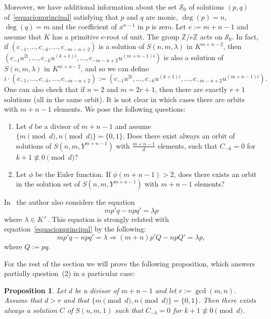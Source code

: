 \documentclass[reqno,a4paper]{amsart}
\newtheorem{proposition}[theorem]{Proposition}
\theoremstyle{definition}
\theoremstyle{remark}
\begin{document}
Moreover, we have additional information about the set $\mathcal{S}_0$ of solutions
$(p,q)$ of~\eqref{equacionprincipal} satisfying that $p$ and $q$ are monic,
$\deg(p) = n$, $\deg(q) = m$ and the coefficient of $x^{n-1}$ in $p$ is zero. Let
$e:=m+n-1$ and assume that $K$ has a primitive $e$-root of unit. The group
$\mathds{Z}/e\mathds{Z}$ acts on $\mathcal{S}_0$. In fact, if
$(c_{-1},\dots,c_{-k},\dots,c_{-m-n+2})$ is a solution of $S(n,m,\lambda)$ in $K^{m+n-2}$,
then $(c_{-1}u^{2i},\dots,c_{-k}u^{(k+1)i},\dots, c_{-m-n+2}u^{(m+n-1)i})$ is also a
solution of $S(n,m,\lambda)$ in $K^{m+n-2}$, and so we can define
$$
i\cdot (c_{-1},\dots,c_{-k},\dots,c_{-m-n+2}) :=
(c_{-1}u^{2i},\dots,c_{-k}u^{(k+1)i},\dots, c_{-m-n+2}u^{(m+n-1)i}).
$$
One can also check that if $n=2$ and $m=2r+1$, then there are exactly $r+1$ solutions
(all in the same orbit). It is not clear in which cases there are orbits with $m+n-1$
elements. We pose the following questions:
\begin{enumerate}

\smallskip

\item Let $d$ be a divisor of $m+n-1$ and assume $\{ m\pmod d,n\pmod d\}=\{0,1\}$. Does there
exist always an orbit of solutions of $S(n,m,Y^{m+n-1})$ with $\frac{m+n-1}{d}$
elements, such that $C_{-k}=0$ for $k+1\not\equiv 0 \pmod d$?

\smallskip

\item Let $\phi$ be the Euler function. If $\phi(m+n-1)>2$, does there exists an
orbit in the solution set of $S(n,m,Y^{m+n-1})$ with $m+n-1$ elements?

\smallskip

\end{enumerate}
%

\smallskip

In~\cite{F} the author also considers the equation
\begin{equation}\label{otra de Formanek}
mp'q-npq'=\lambda p
\end{equation}
where $\lambda\in K^{\times}$. This equation is strongly related with equation~\eqref{equacionprincipal} by
the following:
$$
mp'q-npq'=\lambda\Longrightarrow (m+n)p'Q-npQ'=\lambda p,
$$
where $Q:=pq$.

\smallskip

For the rest of the section we will prove the following proposition, which answers partially question~(2) in a particular case:

\begin{proposition}\label{existencia ralo}
Let $d$ be a divisor of $m+n-1$ and let $r:=\gcd(m,n)$. Assume that $d>r$ and that $\{ m\pmod d,n\pmod d\}=\{0,1\}$.
Then there exists always a solution $C$ of $S(n,m,1)$ such that $C_{-k}=0$ for $k+1\not\equiv 0 \pmod d$.
\end{proposition}
\end{document}
